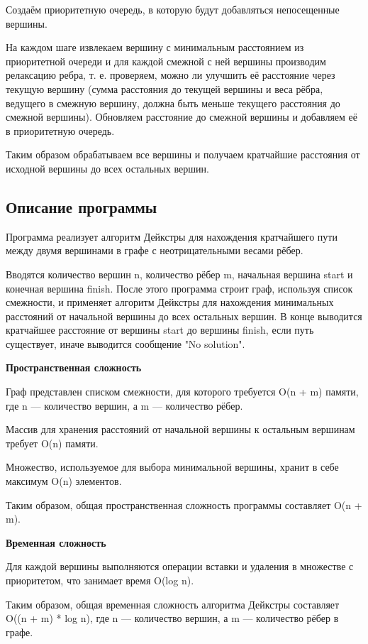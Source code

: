 \documentclass[12pt]{article}
\begin{document}
Создаём приоритетную очередь, в которую будут добавляться непосещенные вершины. 

На каждом шаге извлекаем вершину с минимальным расстоянием из приоритетной очереди и для каждой смежной с ней вершины производим релаксацию ребра, т. е. проверяем, можно ли улучшить её расстояние через текущую вершину (сумма расстояния до текущей вершины и веса рёбра, ведущего в смежную вершину, должна быть меньше текущего расстояния до смежной вершины). Обновляем расстояние до смежной вершины и добавляем её в приоритетную очередь. 

Таким образом обрабатываем все вершины и получаем кратчайшие расстояния от исходной вершины до всех остальных вершин.

\subsection*{Описание программы}

Программа реализует алгоритм Дейкстры для нахождения кратчайшего пути между двумя вершинами в графе с неотрицательными весами рёбер. 

Вводятся количество вершин n, количество рёбер m, начальная вершина start и конечная вершина finish. После этого программа строит граф, используя список смежности, и применяет алгоритм Дейкстры для нахождения минимальных расстояний от начальной вершины до всех остальных вершин. В конце выводится кратчайшее расстояние от вершины start до вершины finish, если путь существует, иначе выводится сообщение "No solution".

\textbf{Пространственная сложность}

Граф представлен списком смежности, для которого требуется O(n + m) памяти, где n — количество вершин, а m — количество рёбер.

Массив для хранения расстояний от начальной вершины к остальным вершинам требует O(n) памяти.

Множество, используемое для выбора минимальной вершины, хранит в себе максимум O(n) элементов.

Таким образом, общая пространственная сложность программы составляет O(n + m).

\textbf{Временная сложность}

Для каждой вершины выполняются операции вставки и удаления в множестве с приоритетом, что занимает время O(log n).

Таким образом, общая временная сложность алгоритма Дейкстры составляет O((n + m) * log n), где n — количество вершин, а m — количество рёбер в графе.
\end{document}
